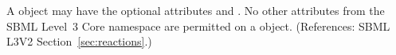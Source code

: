 A \ListOfLocalParameters object may have the optional attributes
  and .  No other attributes from the SBML
Level~3 Core namespace are permitted on a \ListOfLocalParameters object.
(References: SBML L3V2 Section~\ref{sec:reactions}.)
